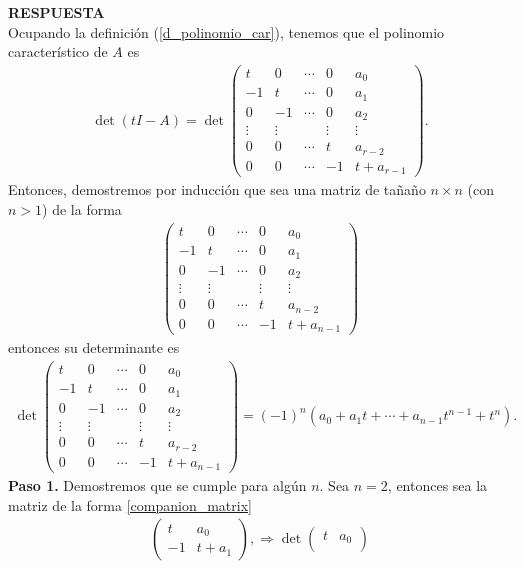 \documentclass[11pt,letterpaper]{article}
\newcommand{\res}{\textbf{RESPUESTA}\\}
\begin{document}
\begin{enumerate}
\res Ocupando la definición (\ref{d_polinomio_car}), tenemos que el polinomio característico de $A$ es 
\begin{align}\label{matriz_rara}
\det(tI-A)=
\det \begin{pmatrix}
t & 0 & \cdots & 0 & a_0\\
-1 & t & \cdots & 0 & a_1\\
0 & -1 & \cdots & 0 & a_2\\
\vdots & \vdots &  & \vdots &\vdots\\
0 & 0 & \cdots & t & a_{r-2}\\
0 & 0 & \cdots & -1 & t+a_{r-1}
\end{pmatrix}.
\end{align}
Entonces, demostremos por inducción que sea una matriz de tañaño $n\times n$ (con $n>1$) de la forma 
\begin{align}\label{companion_matrix}
\begin{pmatrix}
t & 0 & \cdots & 0 & a_0\\
-1 & t & \cdots & 0 & a_1\\
0 & -1 & \cdots & 0 & a_2\\
\vdots & \vdots &  & \vdots &\vdots\\
0 & 0 & \cdots & t & a_{n-2}\\
0 & 0 & \cdots & -1 & t+a_{n-1}
\end{pmatrix}
\end{align}
entonces su determinante es 
\begin{align*}
\det \begin{pmatrix}
t & 0 & \cdots & 0 & a_0\\
-1 & t & \cdots & 0 & a_1\\
0 & -1 & \cdots & 0 & a_2\\
\vdots & \vdots &  & \vdots &\vdots\\
0 & 0 & \cdots & t & a_{r-2}\\
0 & 0 & \cdots & -1 & t+a_{n-1}
\end{pmatrix}=(-1)^n(a_0+a_1t+\cdots+a_{n-1}t^{n-1}+t^n).
\end{align*}
\textbf{Paso 1.} Demostremos que se cumple para algún $n$. Sea $n=2$, entonces sea la matriz de la forma \ref{companion_matrix}
\begin{align*}
\begin{pmatrix}
t & a_0\\
-1& t+a_1
\end{pmatrix},\Rightarrow \det\begin{pmatrix}
t & a_0\\

\end{pmatrix}
\end{align*}
\end{enumerate}
\end{document}
